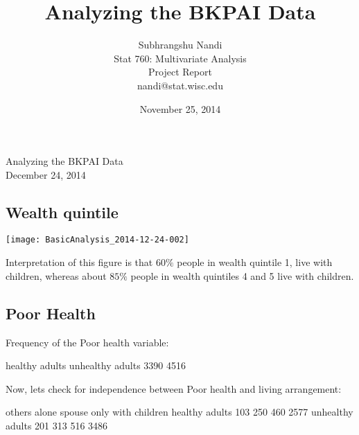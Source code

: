 \documentclass[11pt]{article}
\begin{document}



\title{Analyzing the BKPAI Data}
\author{Subhrangshu Nandi\\
  Stat 760: Multivariate Analysis\\
  Project Report \\
  nandi@stat.wisc.edu}
\date{November 25, 2014}


\begin{center}
{\Large{Analyzing the BKPAI Data}}\\
December 24, 2014
\end{center}

\subsection*{Wealth quintile}
\begin{center}
\texttt{[image: BasicAnalysis\_2014-12-24-002]}
\end{center}
Interpretation of this figure is that $60\%$ people in wealth quintile 1, live with children, whereas about $85\%$ people in wealth quintiles 4 and 5 live with children.

\newpage
\subsection*{Poor Health}
Frequency of the Poor health variable:
\begin{Schunk}
\begin{Soutput}
  healthy adults unhealthy adults 
            3390             4516 
\end{Soutput}
\end{Schunk}
Now, lets check for independence between Poor health and living arrangement:
\begin{Schunk}
\begin{Soutput}
                   others alone spouse only with children
  healthy adults      103   250         460          2577
  unhealthy adults    201   313         516          3486
\end{Soutput}
\end{Schunk}
\end{document}

